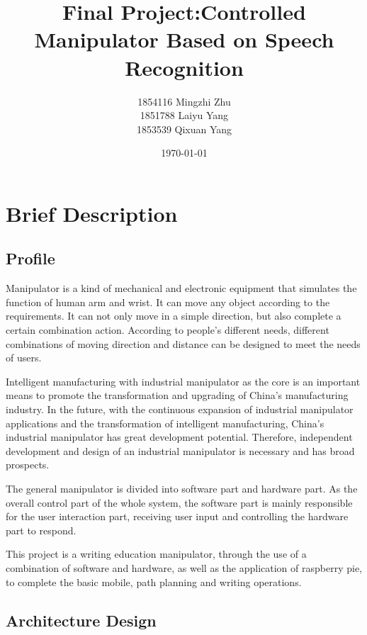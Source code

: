 \documentclass{hci}
\title{Final Project:Controlled Manipulator Based on Speech Recognition}
\author{1854116 Mingzhi Zhu 
	\\1851788 Laiyu Yang
     \\1853539 Qixuan Yang}
\date{\today}
\begin{document}
\maketitle
\tableofcontents
\newpage
\section{Brief Description}
 
\subsection{Profile}
Manipulator is a kind of mechanical and electronic equipment that simulates the function of human arm and wrist. It can move any object according to the requirements. It can not only move in a simple direction, but also complete a certain combination action. According to people's different needs, different combinations of moving direction and distance can be designed to meet the needs of users.

Intelligent manufacturing with industrial manipulator as the core is an important means to promote the transformation and upgrading of China's manufacturing industry. In the future, with the continuous expansion of industrial manipulator applications and the transformation of intelligent manufacturing, China's industrial manipulator has great development potential. Therefore, independent development and design of an industrial manipulator is necessary and has broad prospects.

The general manipulator is divided into software part and hardware part. As the overall control part of the whole system, the software part is mainly responsible for the user interaction part, receiving user input and controlling the hardware part to respond.

This project is a writing education manipulator, through the use of a combination of software and hardware, as well as the application of raspberry pie, to complete the basic mobile, path planning and writing operations.

\subsection{Architecture Design}
\end{document}
